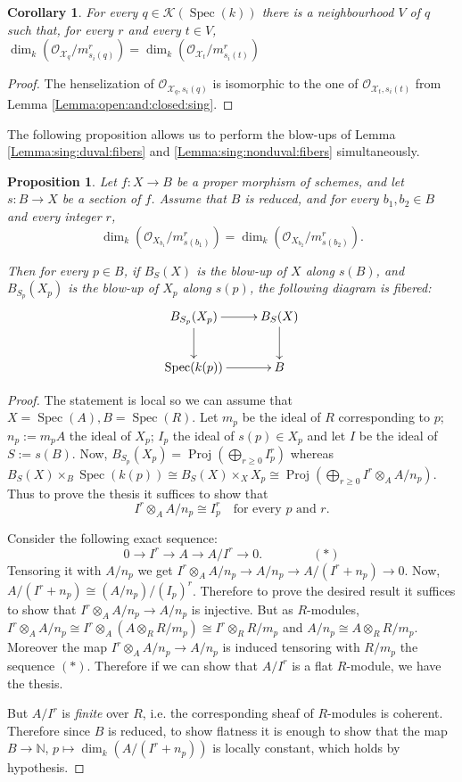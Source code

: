 \documentclass[11pt]{amsart}
\newcommand{\sX}{\mathscr{X}}
\newcommand{\cO}{\mathcal{O}}
\newcommand{\spec}{\operatorname{Spec}}
\newcommand{\Kg}{\mathcal{K}}
\newtheorem{Cor}[theorem]{Corollary}
\newtheorem{Prop}[theorem]{Proposition}
\theoremstyle{definition}
\begin{document}
 \begin{Cor}\label{Corollary:same:dimension:completion}
 For every $q \in \Kg(\spec(k))$ there is a neighbourhood $V$ of $q$ such that, for every $r$ and every $t \in V$,
 $\dim_k(\cO_{\sX_q}/m^r_{s_i(q)})=\dim_k(\cO_{\sX_t}/m^r_{s_i(t)})$
 \end{Cor}
 \begin{proof}
  The henselization of $\cO_{\sX_q,s_i(q)}$ is isomorphic to the one of $\cO_{\sX_t,s_i(t)}$ from Lemma \ref{Lemma:open:and:closed:sing}.
 \end{proof}
The following proposition allows us to perform the blow-ups of Lemma \ref{Lemma:sing:duval:fibers} and \ref{Lemma:sing:nonduval:fibers} simultaneously.
\begin{Prop}\label{Proposition:blowup:commutes}
  Let $f:X \to B$ be a proper morphism of schemes, and let $s:B \to X$ be a section of $f$.
 Assume that $B$ is reduced, and for every $b_1,b_2 \in B$ and every integer $r$,
 $$\dim_k(\cO_{X_{b_1}}/m^r_{s(b_1)})=\dim_k(\cO_{X_{b_2}}/m^r_{s(b_2)}).$$
 
 Then for every $p \in B$, if $B_{S}(X)$ is the blow-up of $X$ along $s(B)$, and
 $B_{S_p}(X_p)$ is the blow-up of $X_p$ along $s(p)$, the following diagram is fibered:
 $$\xymatrix{B_{S_p}(X_p) \ar[r] \ar[d] & B_{S}(X)\ar[d] \\ \spec(k(p)) \ar[r] & B}$$
\end{Prop}
\begin{proof}
 The statement is local so we can assume that $X=\spec(A),B=\spec(R)$. Let $m_p$ be the ideal of $R$ corresponding to $p$; $n_p:=m_pA$ the ideal of
 $X_p$; $I_p$ the ideal of $s(p) \in X_p$ and let $I$ be the ideal of $S:=s(B)$. Now,
 $B_{S_p}(X_p)=\operatorname{Proj}(\bigoplus _{r \ge 0} I_p^r)$ whereas $B_S(X) \times_B \spec(k(p)) \cong B_S(X) \times_X X_p\cong \operatorname{Proj}(\bigoplus _{
 r\ge 0} I^r
 \otimes_A A/n_p)$.
 Thus to prove the thesis it suffices to show that
 $$I^r\otimes_A A/n_p \cong I_p^r \text{ } \text{ for every } p \text{ and }r.$$
 
 
 Consider the following exact sequence:
 $$0 \to I^r \to A \to A/I^r \to 0. \text{ } \text{ }\text{ }\text{ }\text{ }\text{ } (*)$$
 Tensoring it with $A/n_p$ we get
 $ I^r \otimes_A A/n_p  \to A/n_p \to A/(I^r+n_p) \to 0$.
 Now, $A/(I^r+n_p) \cong (A/n_p)/(I_p)^r$. Therefore to prove the desired result it suffices to show that $I^r \otimes_A A/n_p  \to A/n_p$ is injective.
 But as $R$-modules, $I^r \otimes_A A/n_p \cong I^r \otimes_A(A \otimes _R R/m_p) \cong I^r \otimes_R R/m_p$ and $A/n_p \cong A \otimes_R R/m_p$.
 Moreover the map $I^r \otimes_A A/n_p  \to A/n_p$ is induced tensoring with $R/m_p$ the sequence $(*)$. Therefore if we can show that $A/I^r$ is a
 flat $R$-module, we have the thesis.
 
 But $A/I^r$ is \emph{finite} over $R$, i.e. the corresponding sheaf of $R$-modules is coherent. Therefore since $B$ is reduced,
 to show flatness it is enough
 to show that the map $B \to \mathbb{N}$, $p \mapsto \dim_k(A/(I^r+n_p))$ is locally constant, which holds by hypothesis.
\end{proof}
\end{document}
